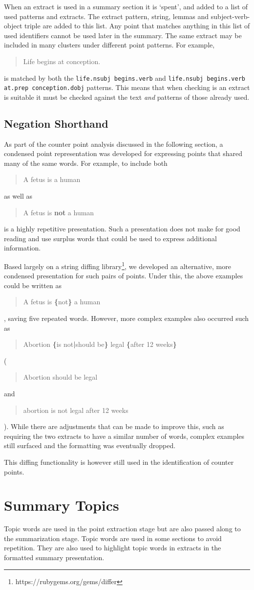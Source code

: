     When an extract is used in a summary section it is `spent', and added to a list of used patterns and extracts. The extract pattern, string, lemmas and subject-verb-object triple are added to this list. Any point that matches anything in this list of used identifiers cannot be used later in the summary. The same extract may be included in many clusters under different point patterns. For example, \blockquote{Life begins at conception.} is matched by both the \texttt{life.nsubj begins.verb} and \texttt{life.nsubj begins.verb at.prep conception.dobj} patterns. This means that when checking is an extract is suitable it must be checked against the text \textit{and} patterns of those already used.

    \tocless\subsection{Negation Shorthand}
      As part of the counter point analysis discussed in the following section, a condensed point representation was developed for expressing points that shared many of the same words. For example, to include both \blockquote{A fetus is a human} as well as \blockquote{A fetus is \textbf{not} a human} is a highly repetitive presentation. Such a presentation does not make for good reading and use surplus words that could be used to express additional information.

      Based largely on a string diffing library\footnote{https://rubygems.org/gems/differ}, we developed an alternative, more condensed presentation for such pairs of points. Under this, the above examples could be written as \blockquote{A fetus is \textbf{\{}not\textbf{\}} a human}, saving five repeated words. However, more complex examples also occurred such as \blockquote{Abortion \textbf{\{}is not\textbf{|}should be\textbf{\}} legal \textbf{\{}after 12 weeks\textbf{\}}} (\blockquote{Abortion should be legal} and \blockquote{abortion is not legal after 12 weeks}). While there are adjustments that can be made to improve this, such as requiring the two extracts to have a similar number of words, complex examples still surfaced and the formatting was eventually dropped.

      This diffing functionality is however still used in the identification of counter points.

  \section{Summary Topics}
    Topic words are used in the point extraction stage but are also passed along to the summarization stage. Topic words are used in some sections to avoid repetition. They are also used to highlight topic words in extracts in the formatted summary presentation.

